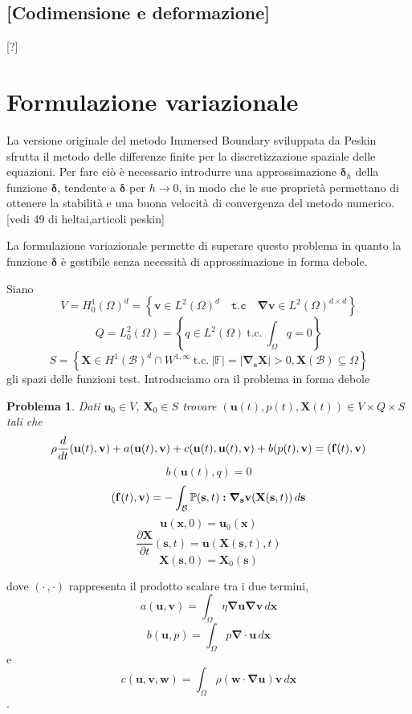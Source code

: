\documentclass{book}
\newtheorem{problem}[theorem]{Problema}
\newcommand{\Nabla}{\boldsymbol{\nabla}}
\newcommand{\tc}{\ \text{t.c.}\ }
\begin{document}
\subsection{[Codimensione e deformazione]}
[?]

\section{Formulazione variazionale}
La versione originale del metodo Immersed Boundary sviluppata da Peskin sfrutta il metodo delle differenze finite per la discretizzazione spaziale delle equazioni. Per fare ciò è necessario introdurre una approssimazione $\boldsymbol{\delta}_h$ della funzione $\boldsymbol{\delta}$, tendente a $\boldsymbol{\delta}$ per $h\to 0$, in modo che le sue proprietà permettano di ottenere la stabilità e una buona velocità di convergenza del metodo numerico.[vedi 49 di heltai,articoli peskin]

La formulazione variazionale permette di superare questo problema in quanto la funzione $\boldsymbol{\delta}$ è gestibile senza necessità di approssimazione in forma debole.

Siano 
$$V=H^1_0(\Omega)^d=\left \{ \mathbf{v}\in L^2(\Omega)^d\quad\texttt{t.c}\quad\Nabla\mathbf{v}\in L^2(\Omega)^{d\times d} \right \}$$
$$Q=L^2_0(\Omega)=\left \{q\in L^2(\Omega)\tc\int_{\Omega}q=0 \right \}$$ 
$$S=\left \{\mathbf{X}\in H^1(\mathcal{B})^d\cap W^{1,\infty}\tc\vert\mathbb{F}\vert =\vert\Nabla_{\mathbf{s}}\mathbf{X}\vert>0,\mathbf{X}(\mathcal{B})\subseteq\Omega \right \}$$
gli spazi delle funzioni test. Introduciamo ora il problema in forma debole
\begin{problem}
Dati $\mathbf{u}_0\in V$, $\mathbf{X}_0\in S$ trovare $(\mathbf{u}(t),p(t),\mathbf{X}(t))\in V\times Q\times S$ tali che
$$\rho\frac{d}{dt}\ps{\mathbf{u}(t)}{\mathbf{v}}+a\ps{\mathbf{u}(t)}{\mathbf{v}}+c({\mathbf{u}(t)},{\mathbf{u}(t)},{\mathbf{v}})+b(p(t),\mathbf{v})=\ps{\mathbf{f}(t)}{\mathbf{v}}$$
$$b(\mathbf{u}(t),q)=0$$
$$\ps{\mathbf{f}(t)}{\mathbf{v}}=-\int_{\mathcal{B}}\mathbb{P}(\mathbf{s},t)\boldsymbol{:}\Nabla_{\mathbf{s}}\mathbf{v}(\mathbf{X}(\mathbf{s},t))\, d\mathbf{s}$$
$$\mathbf{u}(\mathbf{x},0)=\mathbf{u}_0(\mathbf{x})$$
$$\frac{\partial\mathbf{X}}{\partial t}(\mathbf{s},t)=\mathbf{u}(\mathbf{X}(\mathbf{s},t),t)$$
$$\mathbf{X}(\mathbf{s},0)=\mathbf{X}_0(\mathbf{s})$$
\end{problem}
dove $(\cdot\,,\cdot)$ rappresenta il prodotto scalare tra i due termini,
$$a(\mathbf{u},\mathbf{v})= \int_\Omega\eta\Nabla\mathbf{u}\Nabla\mathbf{v}\, d\mathbf{x}$$
$$b(\mathbf{u},p)=\int_\Omega p\Nabla\cdot\mathbf{u}\, d\mathbf{x}$$ e 
$$c(\mathbf{u},\mathbf{v},\mathbf{w})=\int_\Omega\rho(\mathbf{w}\cdot\Nabla\mathbf{u})\mathbf{v}\, d\mathbf{x}$$.
\end{document}
